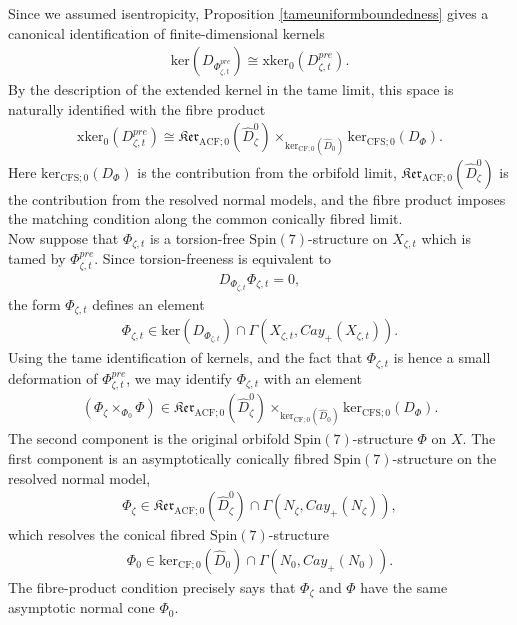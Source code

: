 \documentclass[psamsfonts]{amsart}
\theoremstyle{plain}
\theoremstyle{definition}{
\newtheorem{defi}{Definition}[section]
\newtheorem{ass}{Assumption}
\newtheorem*{nota}{Notation}}
\theoremstyle{remark}{
\newtheorem{rem}{Remark}
\newtheorem{ex}{Example}}
\theoremstyle{plain}{
\newtheorem{thm}{Theorem}[section]
\newtheorem{lem}{Lemma}[section]
\newtheorem{cor}{Corollary}[section]
\newtheorem{prop}{Proposition}[section]
\newtheorem{con}{Conjecture}[section]}
\newcommand{\m}[1]{{\mathrm{#1}}}
\begin{document}
Since we assumed isentropicity, Proposition \ref{tameuniformboundedness} gives a canonical identification of finite-dimensional kernels
\begin{align*}
        \m{ker}(D_{\Phi^{pre}_{\zeta,t}})
        \cong
        \m{xker}_{0}(D^{pre}_{\zeta,t}).
\end{align*}
By the description of the extended kernel in the tame limit, this space is naturally identified with the fibre product
\begin{align*}
        \m{xker}_{0}(D^{pre}_{\zeta,t})
        \cong
        \mathfrak{Ker}_{\m{ACF};0}(\widehat{D}^{0}_{\zeta})
        \times_{\m{ker}_{\m{CF};0}(\widehat{D}_{0})}
        \m{ker}_{\m{CFS};0}(D_{\Phi}).
\end{align*}
Here $\m{ker}_{\m{CFS};0}(D_{\Phi})$ is the contribution from the orbifold limit, $\mathfrak{Ker}_{\m{ACF};0}(\widehat{D}^{0}_{\zeta})$ is the contribution from the resolved normal models, and the fibre product imposes the matching condition along the common conically fibred limit.\\

Now suppose that $\Phi_{\zeta,t}$ is a torsion-free $\m{Spin}(7)$-structure on $X_{\zeta,t}$ which is tamed by $\Phi^{pre}_{\zeta,t}$. Since torsion-freeness is equivalent to
\begin{align*}
        D_{\Phi_{\zeta,t}}\Phi_{\zeta,t}=0,
\end{align*}
the form $\Phi_{\zeta,t}$ defines an element
\begin{align*}
        \Phi_{\zeta,t}
        \in
        \m{ker}(D_{\Phi_{\zeta,t}})
        \cap
        \Gamma(X_{\zeta,t},Cay_+(X_{\zeta,t})).
\end{align*}
Using the tame identification of kernels, and the fact that $\Phi_{\zeta,t}$ is hence a small deformation of $\Phi^{pre}_{\zeta,t}$, we may identify $\Phi_{\zeta,t}$ with an element
\begin{align*}
        (\Phi_{\zeta}\times_{\Phi_0}\Phi)
        \in
        \mathfrak{Ker}_{\m{ACF};0}(\widehat{D}^{0}_{\zeta})
        \times_{\m{ker}_{\m{CF};0}(\widehat{D}_{0})}
        \m{ker}_{\m{CFS};0}(D_{\Phi}).
\end{align*}
The second component is the original orbifold $\m{Spin}(7)$-structure $\Phi$ on $X$. The first component is an asymptotically conically fibred $\m{Spin}(7)$-structure on the resolved normal model,
\begin{align*}
        \Phi_{\zeta}
        \in
        \mathfrak{Ker}_{\m{ACF};0}(\widehat{D}^{0}_{\zeta})
        \cap
        \Gamma(N_{\zeta},Cay_+(N_{\zeta})),
\end{align*}
which resolves the conical fibred $\m{Spin}(7)$-structure
\begin{align*}
        \Phi_{0}
        \in
        \m{ker}_{\m{CF};0}(\widehat{D}_{0})
        \cap
        \Gamma(N_{0},Cay_+(N_{0})).
\end{align*}
The fibre-product condition precisely says that $\Phi_{\zeta}$ and $\Phi$ have the same asymptotic normal cone $\Phi_0$.\\
\end{document}

